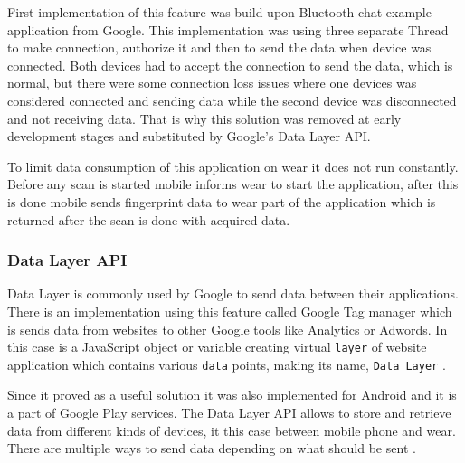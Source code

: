 First implementation of this feature was build upon Bluetooth chat example application from Google. This implementation was using three separate Thread to make connection, authorize it and then to send the data when device was connected. Both devices had to accept the connection to send the data, which is normal, but there were some connection loss issues where one devices was considered connected and sending data while the second device was disconnected and not receiving data. That is why this solution was removed at early development stages and substituted by Google's Data Layer API.

To limit data consumption of this application on wear it does not run constantly. Before any scan is started mobile informs wear to start the application, after this is done mobile sends fingerprint data to wear part of the application which is returned after the scan is done with acquired data.


\subsubsection{Data Layer API}\label{subsec:DataLayerAPI}
Data Layer is commonly used by Google to send data between their applications. There is an implementation using this feature called Google Tag manager which is sends data from websites to other Google tools like Analytics or Adwords. In this case is a JavaScript object or variable creating virtual \verb|layer| of website application which contains various \verb|data| points, making its name, \verb|Data Layer| \cite{GTMDL}.

Since it proved as a useful solution it was also implemented for Android and it is a part of Google Play services. The Data Layer API allows to store and retrieve data from different kinds of devices, it this case between mobile phone and wear. There are multiple ways to send data depending on what should be sent \cite{AD}.

